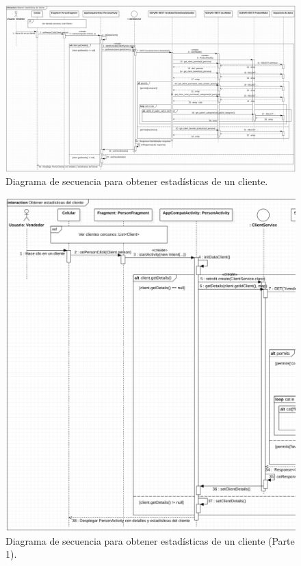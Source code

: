 \FloatBarrier
\begin{figure}[htbp!]
		\centering
			\includegraphics[width=1 \textwidth]{imagenes/adrian/vendedor/prototipo3/detallesCliente}
		\caption{Diagrama de secuencia para obtener estadísticas de un cliente.}
		\label{secuencia-AIPV3-detalles}
\end{figure}
\FloatBarrier

\FloatBarrier
\begin{figure}[htbp!]
		\centering
			\includegraphics[width=1 \textwidth]{imagenes/adrian/vendedor/prototipo3/detallesCliente1}
		\caption{Diagrama de secuencia para obtener estadísticas de un cliente (Parte 1).}
		\label{secuencia-AIPV3-detallesUno}
\end{figure}
\FloatBarrier

